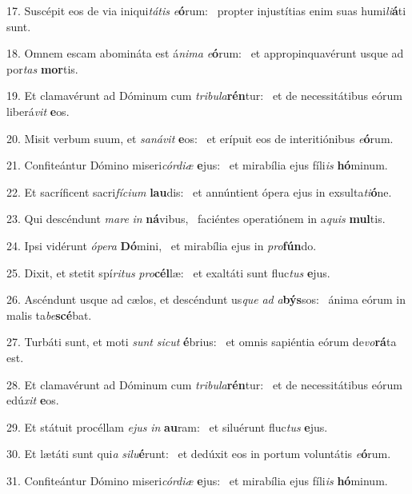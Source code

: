 17. Suscépit eos de via iniqui\textit{tá}\textit{tis} \textit{e}\textbf{ó}rum: \ast\  propter injustítias enim suas humi\textit{li}\textbf{á}ti sunt.\

18. Omnem escam abomináta est á\textit{ni}\textit{ma} \textit{e}\textbf{ó}rum: \ast\  et appropinquavérunt usque ad por\textit{tas} \textbf{mor}tis.\

19. Et clamavérunt ad Dóminum cum \textit{tri}\textit{bu}\textit{la}\textbf{rén}tur: \ast\  et de necessitátibus eórum liberá\textit{vit} \textbf{e}os.\

20. Misit verbum suum, et \textit{sa}\textit{ná}\textit{vit} \textbf{e}os: \ast\  et erípuit eos de interitiónibus \textit{e}\textbf{ó}rum.\

21. Confiteántur Dómino miseri\textit{cór}\textit{di}\textit{æ} \textbf{e}jus: \ast\  et mirabília ejus fíli\textit{is} \textbf{hó}minum.\

22. Et sacríficent sacri\textit{fí}\textit{ci}\textit{um} \textbf{lau}dis: \ast\  et annúntient ópera ejus in exsulta\textit{ti}\textbf{ó}ne.\

23. Qui descéndunt \textit{ma}\textit{re} \textit{in} \textbf{ná}vibus, \ast\  faciéntes operatiónem in a\textit{quis} \textbf{mul}tis.\

24. Ipsi vidérunt \textit{ó}\textit{pe}\textit{ra} \textbf{Dó}mini, \ast\  et mirabília ejus in \textit{pro}\textbf{fún}do.\

25. Dixit, et stetit spí\textit{ri}\textit{tus} \textit{pro}\textbf{cél}læ: \ast\  et exaltáti sunt fluc\textit{tus} \textbf{e}jus.\

26. Ascéndunt usque ad cælos, et descéndunt us\textit{que} \textit{ad} \textit{a}\textbf{býs}sos: \ast\  ánima eórum in malis ta\textit{be}\textbf{scé}bat.\

27. Turbáti sunt, et moti \textit{sunt} \textit{sic}\textit{ut} \textbf{é}brius: \ast\  et omnis sapiéntia eórum de\textit{vo}\textbf{rá}ta est.\

28. Et clamavérunt ad Dóminum cum \textit{tri}\textit{bu}\textit{la}\textbf{rén}tur: \ast\  et de necessitátibus eórum edú\textit{xit} \textbf{e}os.\

29. Et státuit procéllam \textit{e}\textit{jus} \textit{in} \textbf{au}ram: \ast\  et siluérunt fluc\textit{tus} \textbf{e}jus.\

30. Et lætáti sunt qui\textit{a} \textit{si}\textit{lu}\textbf{é}runt: \ast\  et dedúxit eos in portum voluntátis \textit{e}\textbf{ó}rum.\

31. Confiteántur Dómino miseri\textit{cór}\textit{di}\textit{æ} \textbf{e}jus: \ast\  et mirabília ejus fíli\textit{is} \textbf{hó}minum.\

